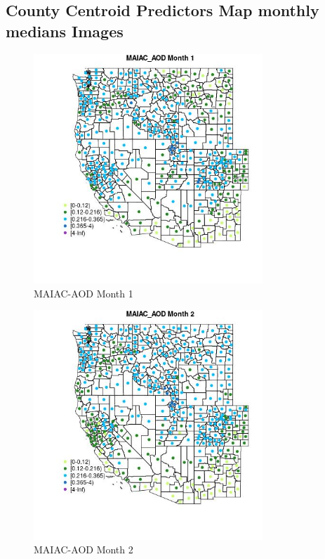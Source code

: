 
\subsection{County Centroid Predictors Map monthly medians Images} 
 

\begin{figure} 
\centering  
\includegraphics[width=0.77\textwidth]{Code_Outputs/df_report_ML_predictors_CountyCentroid_Locations_Dates_2008-01-01to2018-12-31_MapObsMo1MAIAC_AOD.jpg} 
\caption{\label{fig:df_report_ML_predictors_CountyCentroid_Locations_Dates_2008-01-01to2018-12-31MapObsMo1MAIAC_AOD}MAIAC-AOD Month 1} 
\end{figure} 
 

\begin{figure} 
\centering  
\includegraphics[width=0.77\textwidth]{Code_Outputs/df_report_ML_predictors_CountyCentroid_Locations_Dates_2008-01-01to2018-12-31_MapObsMo2MAIAC_AOD.jpg} 
\caption{\label{fig:df_report_ML_predictors_CountyCentroid_Locations_Dates_2008-01-01to2018-12-31MapObsMo2MAIAC_AOD}MAIAC-AOD Month 2} 
\end{figure} 
 

